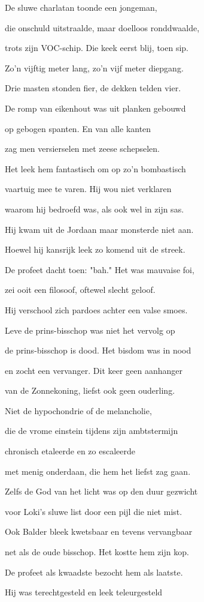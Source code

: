 De sluwe charlatan
toonde een jongeman,

die onschuld uitstraalde,
maar doelloos ronddwaalde,

trots zijn VOC-schip.
Die keek eerst blij, toen sip.

Zo’n vijftig meter lang,
zo’n vijf meter diepgang.

Drie masten stonden fier,
de dekken telden vier.

De romp van eikenhout
was uit planken gebouwd

op gebogen spanten.
En van alle kanten

zag men versierselen
met zeese schepselen.

Het leek hem fantastisch
om op zo’n bombastisch

vaartuig mee te varen.
Hij wou niet verklaren

waarom hij bedroefd was,
als ook wel in zijn sas.

Hij kwam uit de Jordaan
maar monsterde niet aan.

Hoewel hij kansrijk leek
zo komend uit de streek.

De profeet dacht toen: "bah."
Het was mauvaise foi,

zei ooit een filosoof,
oftewel slecht geloof.

Hij verschool zich pardoes
achter een valse smoes.

Leve de prins-bisschop
was niet het vervolg op

de prins-bisschop is dood.
Het bisdom was in nood

en zocht een vervanger.
Dit keer geen aanhanger

van de Zonnekoning,
liefst ook geen ouderling.

Niet de hypochondrie
of de melancholie,

die de vrome einstein
tijdens zijn ambtstermijn

chronisch etaleerde
en zo escaleerde

met menig onderdaan,
die hem het liefst zag gaan.

Zelfs de God van het licht
was op den duur gezwicht

voor Loki’s sluwe list
door een pijl die niet mist.

Ook Balder bleek kwetsbaar
en tevens vervangbaar

net als de oude bisschop.
Het kostte hem zijn kop.

De profeet als kwaadste
bezocht hem als laatste.

Hij was terechtgesteld
en leek teleurgesteld

